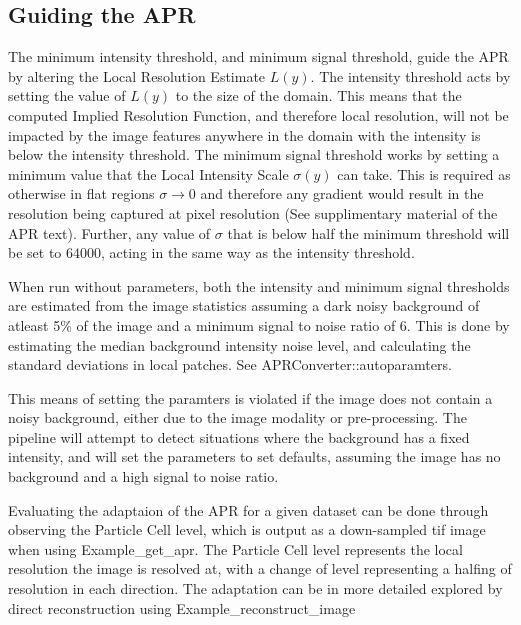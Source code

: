 \documentclass[12pt]{article}
\begin{document}
\subsection{Guiding the APR}
The minimum intensity threshold, and minimum signal threshold, guide the APR by altering the Local Resolution Estimate $L(y)$. The intensity threshold acts by setting the value of $L(y)$ to the size of the domain. This means that the computed Implied Resolution Function, and therefore local resolution, will not be impacted by the image features anywhere in the domain with the intensity is below the intensity threshold. The minimum signal threshold works by setting a minimum value that the Local Intensity Scale $\sigma(y)$ can take. This is required as otherwise in flat regions $\sigma \rightarrow 0$ and therefore any gradient would result in the resolution being captured at pixel resolution (See supplimentary material of the APR text). Further, any value of $\sigma$ that is below half the minimum threshold will be set to $64000$, acting in the same way as the intensity threshold.

When run without parameters, both the intensity and minimum signal thresholds are estimated from the image statistics assuming a dark noisy background of atleast 5\% of the image and a minimum signal to noise ratio of 6. This is done by estimating the median background intensity noise level, and calculating the standard deviations in local patches. See APRConverter::autoparamters.

This means of setting the paramters is violated if the image does not contain a noisy background, either due to the image modality or pre-processing. The pipeline will attempt to detect situations where the background has a fixed intensity, and will set the parameters to set defaults, assuming the image has no background and a high signal to noise ratio.

Evaluating the adaptaion of the APR for a given dataset can be done through observing the Particle Cell level, which is output as a down-sampled tif image when using Example\_get\_apr. The Particle Cell level represents the local resolution the image is resolved at, with a change of level representing a halfing of resolution in each direction. The adaptation can be in more detailed explored by direct reconstruction using Example\_reconstruct\_image
\end{document}
